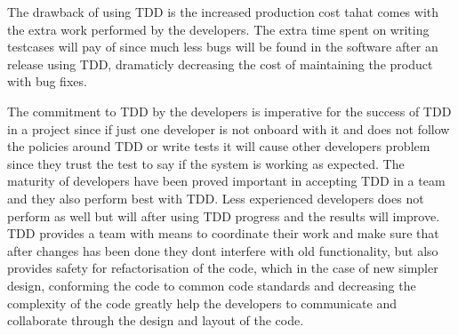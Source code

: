 The drawback of using TDD is the increased production cost tahat comes with the extra work performed by the developers.
The extra time spent on writing testcases will pay of since much less bugs will be found in the software after an release using TDD, dramaticly decreasing the cost of maintaining the product with bug fixes.

The commitment to TDD by the developers is imperative for the success of TDD in a project since if just one developer
is not onboard with it and does not follow the policies around TDD or write tests it will cause other developers problem since they
trust the test to say if the system is working as expected. The maturity of developers have been proved important in accepting TDD
in a team and they also perform best with TDD. Less experienced developers does not perform as well but will after using TDD progress and
the results will improve.
TDD provides a team with means to coordinate their work and make sure that after changes has been done they dont interfere with old functionality, but also provides safety for refactorisation of the code, which in the case of new simpler design, conforming the code to common code standards and decreasing the complexity of the code greatly help the developers to communicate and collaborate through the design and layout of the code. 

